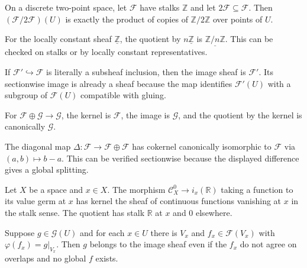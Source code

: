 \begin{example}
On a discrete two-point space, let $\mathcal F$ have stalks $\mathbb Z$ and let $2\mathcal F\subseteq\mathcal F$. Then $(\mathcal F/2\mathcal F)(U)$ is exactly the product of copies of $\mathbb Z/2\mathbb Z$ over points of $U$.
\end{example}

\begin{example}
For the locally constant sheaf $\underline{\mathbb Z}$, the quotient by $n\underline{\mathbb Z}$ is $\underline{\mathbb Z/n\mathbb Z}$. This can be checked on stalks or by locally constant representatives.
\end{example}

\begin{example}
If $\mathcal F'\hookrightarrow\mathcal F$ is literally a subsheaf inclusion, then the image sheaf is $\mathcal F'$. Its sectionwise image is already a sheaf because the map identifies $\mathcal F'(U)$ with a subgroup of $\mathcal F(U)$ compatible with gluing.
\end{example}

\begin{example}
For $\mathcal F\oplus\mathcal G\to\mathcal G$, the kernel is $\mathcal F$, the image is $\mathcal G$, and the quotient by the kernel is canonically $\mathcal G$.
\end{example}

\begin{example}
The diagonal map $\Delta:\mathcal F\to\mathcal F\oplus\mathcal F$ has cokernel canonically isomorphic to $\mathcal F$ via $(a,b)\mapsto b-a$. This can be verified sectionwise because the displayed difference gives a global splitting.
\end{example}

\begin{example}
Let $X$ be a space and $x\in X$. The morphism $\mathcal C^0_X\to i_x(\mathbb R)$ taking a function to its value germ at $x$ has kernel the sheaf of continuous functions vanishing at $x$ in the stalk sense. The quotient has stalk $\mathbb R$ at $x$ and $0$ elsewhere.
\end{example}

\begin{example}
Suppose $g\in\mathcal G(U)$ and for each $x\in U$ there is $V_x$ and $f_x\in\mathcal F(V_x)$ with $\varphi(f_x)=g|_{V_x}$. Then $g$ belongs to the image sheaf even if the $f_x$ do not agree on overlaps and no global $f$ exists.
\end{example}

